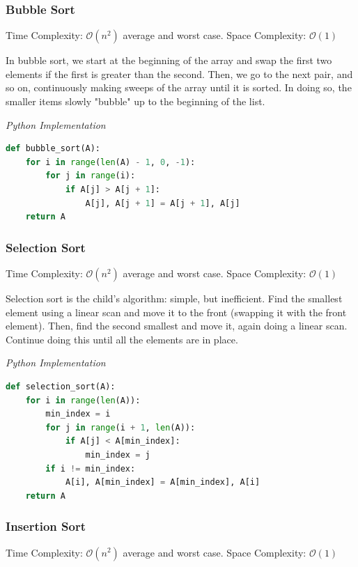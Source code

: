 \documentclass{article}
\newcommand{\bigO}{\mathcal{O}}
\begin{document}
    \subsubsection{Bubble Sort}
    Time Complexity: $\bigO(n^2)$ average and worst case. Space Complexity: $\bigO(1)$
     
    In bubble sort, we start at the beginning of the array and swap the first two elements if the first is greater than the second. Then, we go to the next pair, and so on, continuously making sweeps of the array until it is
    sorted. In doing so, the smaller items slowly "bubble" up to the beginning of the list. 

\vspace{8pt} \emph{Python Implementation}
\begin{lstlisting}[language=Python]
def bubble_sort(A):
    for i in range(len(A) - 1, 0, -1):
        for j in range(i):
            if A[j] > A[j + 1]:
                A[j], A[j + 1] = A[j + 1], A[j]
    return A
\end{lstlisting}
    \subsubsection{Selection Sort}
    Time Complexity: $\bigO(n^2)$ average and worst case. Space Complexity: $\bigO (1)$
    
    Selection sort is the child's algorithm: simple, but inefficient. Find the smallest element using a linear scan and move it to the front (swapping it with the front element). Then, find the second smallest and move it, again doing a linear scan. Continue doing this until all the elements are in place. 

\vspace{8pt} \emph{Python Implementation}
\begin{lstlisting}[language=Python]
def selection_sort(A):
    for i in range(len(A)):
        min_index = i
        for j in range(i + 1, len(A)):
            if A[j] < A[min_index]:
                min_index = j
        if i != min_index: 
            A[i], A[min_index] = A[min_index], A[i]
    return A
\end{lstlisting}
    
    \subsubsection{Insertion Sort}
    Time Complexity: $\bigO(n^2)$ average and worst case. Space Complexity: $\bigO(1)$
    
\end{document}
